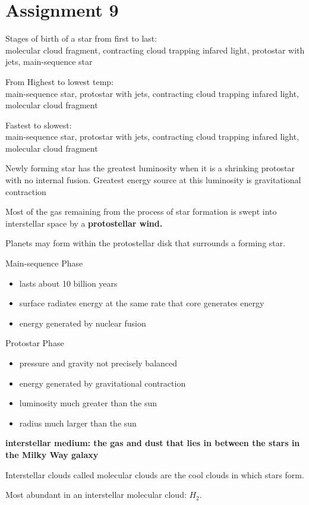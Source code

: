 \section{Assignment 9}
Stages of birth of a star from first to last:\\
molecular cloud fragment, contracting cloud trapping infared light, protostar with jets, main-sequence star

From Highest to lowest temp:\\
main-sequence star, protostar with jets, contracting cloud trapping infared light, molecular cloud fragment

Fastest to slowest:\\
main-sequence star, protostar with jets, contracting cloud trapping infared light, molecular cloud fragment

Newly forming star has the greatest luminosity when it is a shrinking protostar with no internal fusion. Greatest energy source at this luminosity is gravitational contraction

Most of the gas remaining from the process of star formation is swept into interstellar space by a \bf{protostellar wind}.

Planets may form within the protostellar disk that surrounds a forming star.

Main-sequence Phase
\begin{itemize}
\item lasts about 10 billion years
\item surface radiates energy at the same rate that core generates energy
\item energy generated by nuclear fusion
\end{itemize}

Protostar Phase
\begin{itemize}
\item pressure and gravity not precisely balanced
\item energy generated by gravitational contraction
\item luminosity much greater than the sun
\item radius much larger than the sun
\end{itemize}

\bf{interstellar medium}: the gas and dust that lies in between the stars in the Milky Way galaxy

Interstellar clouds called molecular clouds are the cool clouds in which stars form.

Most abundant in an interstellar molecular cloud: $H_2$.

